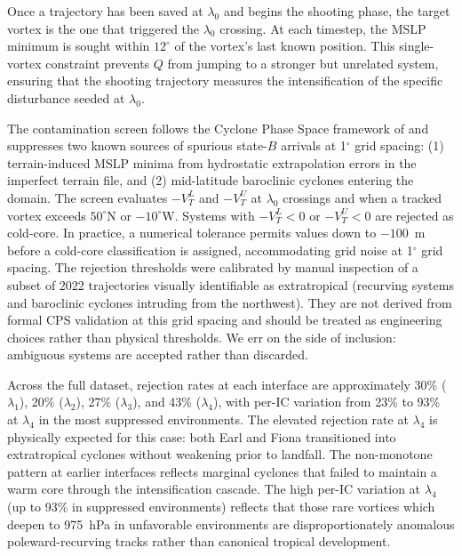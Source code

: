 \documentclass[11pt]{article}
\begin{document}
Once a trajectory has been saved at $\lambda_0$ and begins the shooting phase, the
target vortex is the one that triggered the $\lambda_0$ crossing.  At each timestep,
the MSLP minimum is sought within $12^\circ$ of the vortex's last known position.
This single-vortex constraint prevents $Q$ from jumping to a stronger but unrelated
system, ensuring that the shooting trajectory measures the intensification of the
specific disturbance seeded at $\lambda_0$.

The contamination screen follows the Cyclone Phase Space framework of \citet{hart2003cyclone}
and suppresses two known sources of spurious state-$B$ arrivals at 1$^\circ$ grid spacing:
(1) terrain-induced MSLP minima from hydrostatic extrapolation errors in the imperfect
terrain file, and (2) mid-latitude baroclinic cyclones entering the domain.
The screen evaluates $-V_T^L$ and $-V_T^U$ at $\lambda_0$ crossings and when a
tracked vortex exceeds $50^\circ$N or $-10^\circ$W. Systems with $-V_T^L < 0$ or
$-V_T^U < 0$ are rejected as cold-core. In practice, a numerical tolerance permits
values down to $-100$~m before a cold-core classification is assigned, accommodating
grid noise at 1$^\circ$ grid spacing.
The rejection thresholds were calibrated by manual inspection of a subset of 2022
trajectories visually identifiable as extratropical (recurving systems and baroclinic
cyclones intruding from the northwest). They are not derived from formal CPS
validation at this grid spacing and should be treated as engineering choices rather
than physical thresholds. We err on the side of inclusion: ambiguous systems are accepted rather than discarded.

Across the full dataset, rejection rates at each interface are approximately
30\% ($\lambda_1$), 20\% ($\lambda_2$), 27\% ($\lambda_3$), and 43\% ($\lambda_4$),
with per-IC variation from 23\% to 93\% at $\lambda_4$ in the most suppressed environments.
The elevated rejection rate at $\lambda_4$ is physically expected for this case: both Earl and Fiona transitioned into extratropical cyclones without weakening prior to landfall.
The non-monotone pattern at earlier interfaces reflects marginal cyclones that failed
to maintain a warm core through the intensification cascade.
The high per-IC variation at $\lambda_4$ (up to 93\% in suppressed environments)
reflects that those rare vortices which deepen to 975~hPa in unfavorable environments
are disproportionately anomalous poleward-recurving tracks rather than canonical
tropical development.
\end{document}
